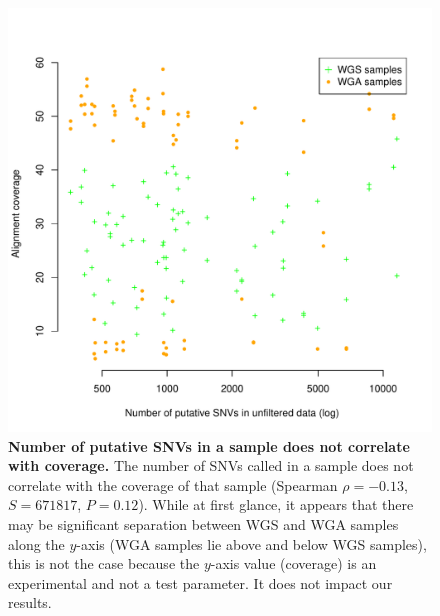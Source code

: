 \documentclass[11 pt]{article} %
\begin{document}
\begin{figure}
\centerline{
\includegraphics[width=5in]{FigureS2.pdf} }
\caption{\textbf{Number of putative SNVs in a sample does not correlate with coverage.} The number of SNVs called in a sample does not correlate with the coverage of that sample  (Spearman $\rho=-0.13$, $S=671817$, $P=0.12$). While at first glance, it appears that there may be significant separation between WGS and WGA samples along the $y$-axis (WGA samples lie above and below WGS samples), this is not the case because the $y$-axis value (coverage) is an experimental and not a test parameter. It does not impact our results.} 
\label{fig:coverage}
\end{figure}
\end{document}
